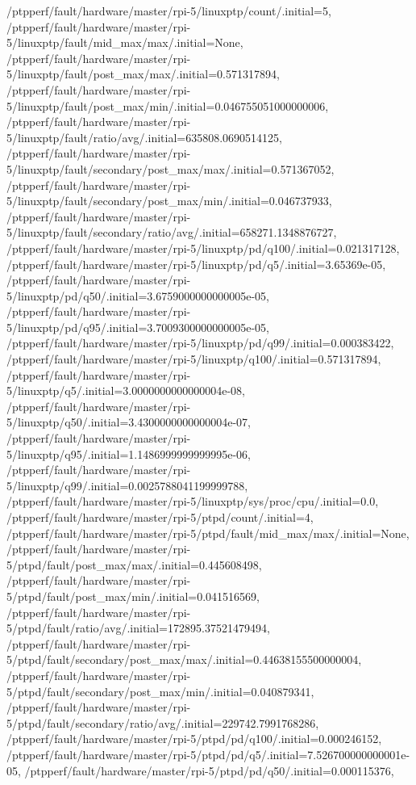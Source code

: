 {    /ptpperf/fault/hardware/master/rpi-5/linuxptp/count/.initial=5,
    /ptpperf/fault/hardware/master/rpi-5/linuxptp/fault/mid_max/max/.initial=None,
    /ptpperf/fault/hardware/master/rpi-5/linuxptp/fault/post_max/max/.initial=0.571317894,
    /ptpperf/fault/hardware/master/rpi-5/linuxptp/fault/post_max/min/.initial=0.046755051000000006,
    /ptpperf/fault/hardware/master/rpi-5/linuxptp/fault/ratio/avg/.initial=635808.0690514125,
    /ptpperf/fault/hardware/master/rpi-5/linuxptp/fault/secondary/post_max/max/.initial=0.571367052,
    /ptpperf/fault/hardware/master/rpi-5/linuxptp/fault/secondary/post_max/min/.initial=0.046737933,
    /ptpperf/fault/hardware/master/rpi-5/linuxptp/fault/secondary/ratio/avg/.initial=658271.1348876727,
    /ptpperf/fault/hardware/master/rpi-5/linuxptp/pd/q100/.initial=0.021317128,
    /ptpperf/fault/hardware/master/rpi-5/linuxptp/pd/q5/.initial=3.65369e-05,
    /ptpperf/fault/hardware/master/rpi-5/linuxptp/pd/q50/.initial=3.6759000000000005e-05,
    /ptpperf/fault/hardware/master/rpi-5/linuxptp/pd/q95/.initial=3.7009300000000005e-05,
    /ptpperf/fault/hardware/master/rpi-5/linuxptp/pd/q99/.initial=0.000383422,
    /ptpperf/fault/hardware/master/rpi-5/linuxptp/q100/.initial=0.571317894,
    /ptpperf/fault/hardware/master/rpi-5/linuxptp/q5/.initial=3.0000000000000004e-08,
    /ptpperf/fault/hardware/master/rpi-5/linuxptp/q50/.initial=3.4300000000000004e-07,
    /ptpperf/fault/hardware/master/rpi-5/linuxptp/q95/.initial=1.1486999999999995e-06,
    /ptpperf/fault/hardware/master/rpi-5/linuxptp/q99/.initial=0.0025788041199999788,
    /ptpperf/fault/hardware/master/rpi-5/linuxptp/sys/proc/cpu/.initial=0.0,
    /ptpperf/fault/hardware/master/rpi-5/ptpd/count/.initial=4,
    /ptpperf/fault/hardware/master/rpi-5/ptpd/fault/mid_max/max/.initial=None,
    /ptpperf/fault/hardware/master/rpi-5/ptpd/fault/post_max/max/.initial=0.445608498,
    /ptpperf/fault/hardware/master/rpi-5/ptpd/fault/post_max/min/.initial=0.041516569,
    /ptpperf/fault/hardware/master/rpi-5/ptpd/fault/ratio/avg/.initial=172895.37521479494,
    /ptpperf/fault/hardware/master/rpi-5/ptpd/fault/secondary/post_max/max/.initial=0.44638155500000004,
    /ptpperf/fault/hardware/master/rpi-5/ptpd/fault/secondary/post_max/min/.initial=0.040879341,
    /ptpperf/fault/hardware/master/rpi-5/ptpd/fault/secondary/ratio/avg/.initial=229742.7991768286,
    /ptpperf/fault/hardware/master/rpi-5/ptpd/pd/q100/.initial=0.000246152,
    /ptpperf/fault/hardware/master/rpi-5/ptpd/pd/q5/.initial=7.526700000000001e-05,
    /ptpperf/fault/hardware/master/rpi-5/ptpd/pd/q50/.initial=0.000115376,
}
